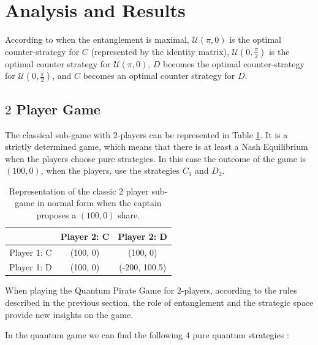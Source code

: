 \documentclass[10pt]{llncs}
\begin{document}
\section{Analysis and Results}
\label{sec:description_3}


According to \cite{Du} when the entanglement is maximal, $\mathcal{U}(\pi, 0)$ is the optimal counter-strategy for $C$ (represented by the identity matrix), $\mathcal{U}(0, \frac{\pi}{2})$ is the optimal counter strategy for $\mathcal{U}(\pi, 0)$, $D$ becomes the optimal counter-strategy for $\mathcal{U}(0, \frac{\pi}{2})$, and $C$ becomes an optimal counter strategy for $D$. 

\subsection{$2$ Player Game}
\label{subsec:2playergame}

 The classical sub-game with $2$-players can be represented in Table \ref{tab:classico2jogadores_analise}. It is a strictly determined game, which means that there is at least a Nash Equilibrium when the players choose pure strategies\cite{Leyton-Brown2008:Essentials_Game_Theory}. In this case the outcome of the game is $(100, 0)$, when the players, use the strategies $C_{1}$ and $D_{2}$.  

\begin{table}[h]
\begin{center}
\begin{centering}
\begin{tabular}{ccc}
\hline 
  & Player 2: C & Player 2: D\tabularnewline
\hline 
Player 1: C & (100, 0) & (100, 0)\tabularnewline
Player 1: D & (100, 0) & (-200, 100.5)\tabularnewline
\hline 
\end{tabular}

\par\end{centering}
\caption{Representation of the classic $2$ player sub-game in normal form when the captain proposes a $(100, 0)$ share.}
\label{tab:classico2jogadores_analise}
\end{center}
\end{table}

When playing the Quantum Pirate Game for $2$-players, according to the rules described in the previous section, the role of entanglement and the strategic space provide new insights on the game. 

In the quantum game we can find the following $4$ pure quantum strategies :
\end{document}
